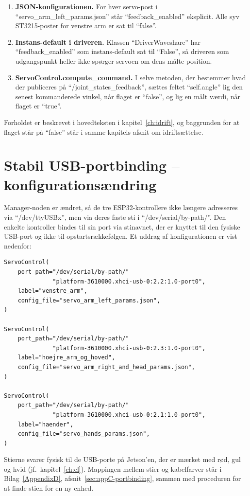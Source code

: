 \begin{enumerate}
    \item \textbf{JSON-konfigurationen.} For hver servo-post i
        \enquote{servo\_arm\_left\_params.json} står
        \enquote{feedback\_enabled} eksplicit. Alle syv ST3215-poster
        for venstre arm er sat til \enquote{false}.
    \item \textbf{Instans-default i driveren.} Klassen
        \enquote{DriverWaveshare} har \enquote{feedback\_enabled}
        som instans-default sat til \enquote{False}, så driveren
        som udgangspunkt heller ikke spørger servoen om dens
        målte position.
    \item \textbf{ServoControl.compute\_command.} I selve metoden,
        der bestemmer hvad der publiceres på
        \enquote{/joint\_states\_feedback}, sættes feltet
        \enquote{self.angle} lig den senest kommanderede vinkel,
        når flaget er \enquote{false}, og lig en målt værdi, når
        flaget er \enquote{true}.
\end{enumerate}

Forholdet er beskrevet i hovedteksten i kapitel~\ref{ch:idrift},
og baggrunden for at flaget står på \enquote{false} står i samme
kapitels afsnit om idriftsættelse.

\clearpage
\section{Stabil USB-portbinding -- konfigurationsændring}
\label{sec:appB-portbinding}

Manager-noden er ændret, så de tre ESP32-kontrollere ikke længere
adresseres via \enquote{/dev/ttyUSBx}, men via deres faste sti i
\enquote{/dev/serial/by-path/}. Den enkelte kontroller bindes til
sin port via stinavnet, der er knyttet til den fysiske USB-port og
ikke til opstartsrækkefølgen. Et uddrag af konfigurationen er vist
nedenfor:

\begin{verbatim}
ServoControl(
    port_path="/dev/serial/by-path/"
              "platform-3610000.xhci-usb-0:2.2:1.0-port0",
    label="venstre_arm",
    config_file="servo_arm_left_params.json",
)

ServoControl(
    port_path="/dev/serial/by-path/"
              "platform-3610000.xhci-usb-0:2.3:1.0-port0",
    label="hoejre_arm_og_hoved",
    config_file="servo_arm_right_and_head_params.json",
)

ServoControl(
    port_path="/dev/serial/by-path/"
              "platform-3610000.xhci-usb-0:2.1:1.0-port0",
    label="haender",
    config_file="servo_hands_params.json",
)
\end{verbatim}

Stierne svarer fysisk til de USB-porte på Jetson'en, der er mærket
med rød, gul og hvid (jf.~kapitel~\ref{ch:el}). Mappingen mellem
stier og kabelfarver står i Bilag~\ref{AppendixD},
afsnit~\ref{sec:appC-portbinding}, sammen med proceduren for at
finde stien for en ny enhed.
